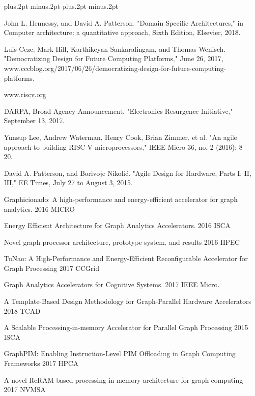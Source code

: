 \documentclass[twoside]{article}
\begin{document}
\begin{multicols}{2}
\printbibliography

\begin{thebibliography}{99}
\footnotesize
\itemsep=-3pt plus.2pt minus.2pt
\baselineskip=11pt plus.2pt minus.2pt

 John L. Hennessy, and David A. Patterson. "Domain Specific Architectures," in Computer architecture: a quantitative approach, Sixth Edition, Elsevier, 2018.

 Luis Ceze, Mark Hill, Karthikeyan Sankaralingam, and Thomas Wenisch. "Democratizing Design for Future Computing Platforms," June 26, 2017, www.cccblog.org/2017/06/26/democratizing-design-for-future-computing-platforms.

 www.riscv.org

 DARPA, Broad Agency Announcement. "Electronics Resurgence Initiative," September 13, 2017.

 Yunsup Lee, Andrew Waterman, Henry Cook, Brian Zimmer, et al. "An agile approach to building RISC-V microprocessors," IEEE Micro 36, no. 2 (2016): 8-20.

 David A. Patterson, and Borivoje Nikolić. "Agile Design for Hardware, Parts I, II, III," EE Times, July 27 to August 3, 2015.

 Graphicionado: A high-performance and energy-efficient accelerator for graph analytics. 2016 MICRO

 Energy Efficient Architecture for Graph Analytics Accelerators. 2016 ISCA

 Novel graph processor architecture, prototype system, and results 2016 HPEC

 TuNao: A High-Performance and Energy-Efficient Reconfigurable Accelerator for Graph Processing 2017 CCGrid

 Graph Analytics Accelerators for Cognitive Systems. 2017 IEEE Micro.

 A Template-Based Design Methodology for Graph-Parallel Hardware Accelerators 2018 TCAD

 A Scalable Processing-in-memory Accelerator for Parallel Graph Processing 2015 ISCA

 GraphPIM: Enabling Instruction-Level PIM Offloading in Graph Computing Frameworks 2017 HPCA

 A novel ReRAM-based processing-in-memory architecture for graph computing 2017 NVMSA


\end{thebibliography}
\end{multicols}
\end{document}
